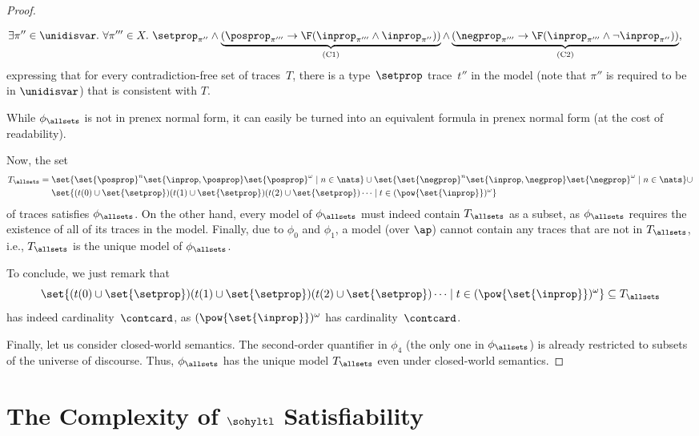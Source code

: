 \begin{proof}
\begin{itemize}
\begin{align*}
&{}\exists \pi'' \in \unidisvar.\ \forall \pi''' \in X.\ \setprop_{\pi''} \wedge  \underbrace{(\posprop_{\pi'''} \rightarrow \F(\inprop_{\pi'''} \wedge \inprop_{\pi''}))}_{\text{(C1)}}
\wedge 
\underbrace{(\negprop_{\pi'''} \rightarrow \F(\inprop_{\pi'''} \wedge \neg\inprop_{\pi''}))}_{\text{(C2)}},
\end{align*} 
expressing that for every contradiction-free set of traces~$T$, there is a type~$\setprop$ trace~$t''$ in the model (note that $\pi''$ is required to be in $\unidisvar$) that is consistent with $T$. 
\end{itemize}
While $\phi_\allsets$ is not in prenex normal form, it can easily be turned into an equivalent formula in prenex normal form (at the cost of readability).

Now, the set 
\begin{align*}
T_\allsets ={}&{} \set{\set{\posprop}^n \set{\inprop,\posprop} \set{\posprop}^\omega \mid n\in\nats} \cup \set{\set{\negprop}^n \set{\inprop,\negprop} \set{\negprop}^\omega \mid n\in\nats} \cup\\
&{}\set{ (t(0) \cup \set{\setprop})(t(1) \cup \set{\setprop})(t(2) \cup \set{\setprop}) \cdots \mid t \in (\pow{\set{\inprop}})^\omega} 
\end{align*}
of traces satisfies $\phi_\allsets$.
On the other hand, every model of $\phi_\allsets$ must indeed contain $T_\allsets$ as a subset, as $\phi_\allsets$ requires the existence of all of its traces in the model.
Finally, due to $\phi_0$ and $\phi_1$, a model (over $\ap$) cannot contain any traces that are not in $T_\allsets$,
i.e., $T_\allsets$ is the unique model of $\phi_\allsets$.

To conclude, we just remark that 
\[\set{ (t(0) \cup \set{\setprop})(t(1) \cup \set{\setprop})(t(2) \cup \set{\setprop}) \cdots \mid t \in (\pow{\set{\inprop}})^\omega} \subseteq T_\allsets\] has indeed cardinality~$\contcard$, as
$(\pow{\set{\inprop}})^\omega$ has cardinality~$\contcard$.

Finally, let us consider closed-world semantics. The second-order quantifier in $\phi_4$ (the only one in $\phi_\allsets$) is already restricted to subsets of the universe of discourse.
Thus, $\phi_\allsets$ has the unique model $T_\allsets$ even under closed-world semantics.
\end{proof}


\section{\texorpdfstring{The Complexity of $\sohyltl$ Satisfiability}{The Complexity of Second-order HyperLTL Satisfiability}}
\label{sec_sat}

